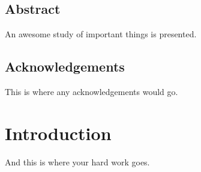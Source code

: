 \documentclass[oneside, letterpaper, 12pt, oldfontcommands]{memoir}
\newcommand{\myabstract}{An awesome study of important things is presented.}
\begin{document}
\frontmatter


\thetitlepage
\clearpage

\thispagestyle{empty}
\vfill
\phantom{
Copyright Ima Student 2012
}

\cleardoublepage
\setcounter{page}{1}

\section{Abstract}
\myabstract
\clearpage

\section{Acknowledgements}
This is where any acknowledgements would go.
\clearpage

\tableofcontents %

\mainmatter

\chapter{Introduction}
And this is where your hard work goes.
\end{document}
